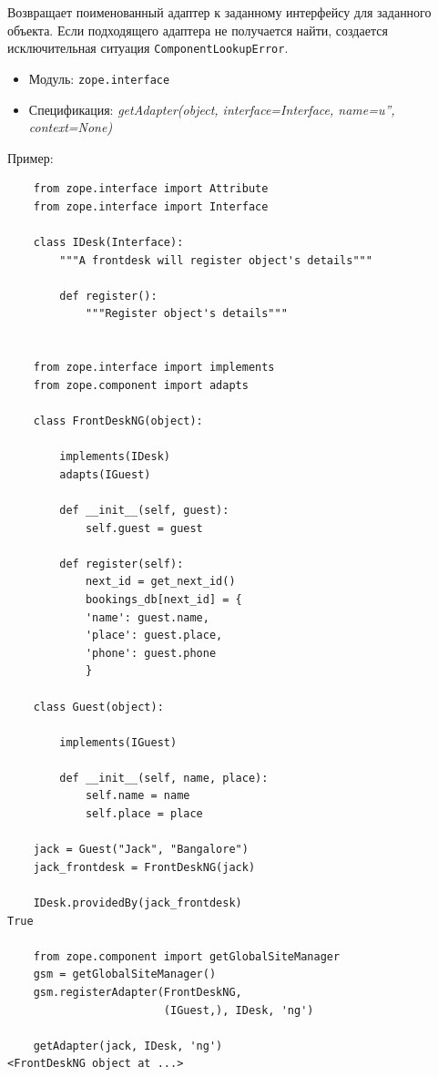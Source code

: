 \documentclass[a4paper,openany,twoside,final]{book}
\providecommand*{\DUroletitlereference}[1]{\textsl{#1}}
\begin{document}
Возвращает поименованный адаптер к заданному интерфейсу для заданного объекта.  Если подходящего адаптера не получается найти, создается исключительная ситуация \texttt{ComponentLookupError}.

\begin{itemize}

\item Модуль: \texttt{zope.interface}

\item Спецификация: \DUroletitlereference{getAdapter(object, interface=Interface, name=u'', context=None)}

\end{itemize}

Пример:

\begin{verbatim}
    from zope.interface import Attribute
    from zope.interface import Interface

    class IDesk(Interface):
        """A frontdesk will register object's details"""

        def register():
            """Register object's details"""


    from zope.interface import implements
    from zope.component import adapts

    class FrontDeskNG(object):

        implements(IDesk)
        adapts(IGuest)

        def __init__(self, guest):
            self.guest = guest

        def register(self):
            next_id = get_next_id()
            bookings_db[next_id] = {
            'name': guest.name,
            'place': guest.place,
            'phone': guest.phone
            }

    class Guest(object):

        implements(IGuest)

        def __init__(self, name, place):
            self.name = name
            self.place = place

    jack = Guest("Jack", "Bangalore")
    jack_frontdesk = FrontDeskNG(jack)

    IDesk.providedBy(jack_frontdesk)
True

    from zope.component import getGlobalSiteManager
    gsm = getGlobalSiteManager()
    gsm.registerAdapter(FrontDeskNG,
                        (IGuest,), IDesk, 'ng')

    getAdapter(jack, IDesk, 'ng')
<FrontDeskNG object at ...>
\end{verbatim}
\end{document}
